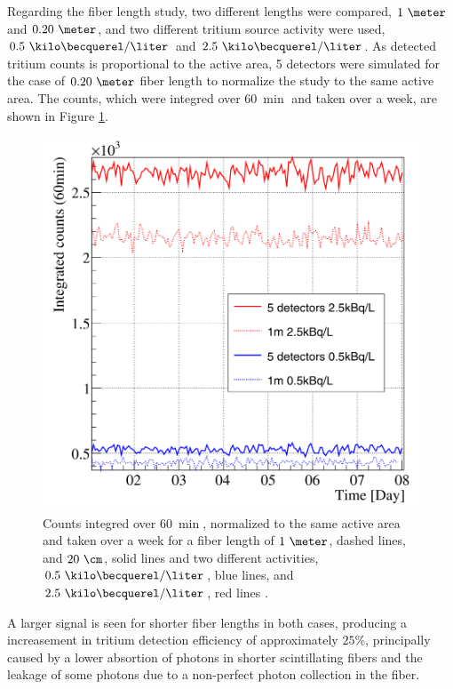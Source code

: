 Regarding the fiber length study, two different lengths were compared, $1~\meter$ and $0.20~\meter$, and two different tritium source activity were used, $0.5~\kilo\becquerel/\liter$ and $2.5~\kilo\becquerel/\liter$. As detected tritium counts is proportional to the active area, 5 detectors were simulated for the case of $0.20~\meter$ fiber length to normalize the study to the same active area. The counts, which were integred over $60~\min$ and taken over a week, are shown in Figure \ref{fig:CountsOver60minDifferentLength}.

\begin{figure}[h]
\centering
\includegraphics[scale=0.3]{Figures/8SimulationsResults/81TRITIUMDesign/813Length/2DifferentLength.png}
\caption{Counts integred over $60~\min$, normalized to the same active area and taken over a week for a fiber length of $1~\meter$, dashed lines, and $20~\cm$, solid lines and two different activities, $0.5~\kilo\becquerel/\liter$, blue lines, and $2.5~\kilo\becquerel/\liter$, red lines \cite{SimulationPaperCarlos}. \label{fig:CountsOver60minDifferentLength}}
\end{figure}

A larger signal is seen for shorter fiber lengths in both cases, producing a increasement in tritium detection efficiency of approximately $25\%$, principally caused by a lower absortion of photons in shorter scintillating fibers and the leakage of some photons due to a non-perfect photon collection in the fiber.